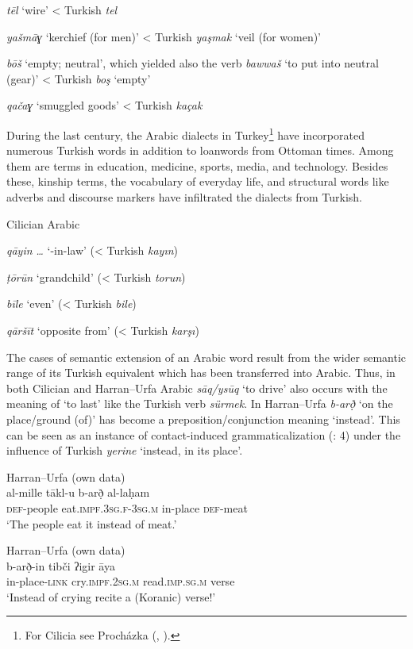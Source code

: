 \documentclass[output=paper]{langsci/langscibook}
\begin{document}
\textit{tēl} ‘wire’ < Turkish \textit{tel}

\textit{yašmāɣ} ‘kerchief (for men)’ < Turkish \textit{yaşmak} ‘veil (for women)’

\textit{bōš} ‘empty; neutral’, which yielded also the verb \textit{bawwaš} ‘to put into neutral (gear)’ < Turkish \textit{boş} ‘empty’

\textit{qačaɣ} ‘smuggled goods’ < Turkish \textit{kaçak}
\z

During the last century, the Arabic dialects in Turkey\footnote{For Cilicia see Procházka (\citeyear{Procházka2002Cukurova}, \citeyear[187--199]{Procházka2002Adana}).} have incorporated numerous Turkish words in addition to loanwords from Ottoman times. Among them are terms in education, medicine, sports, media, and technology. Besides these, kinship terms, the vocabulary of everyday life, and structural words like adverbs and discourse markers have infiltrated the dialects from Turkish. 

\ea
Cilician Arabic

\textit{qāyin} \textit{…} ‘-in-law’ (< Turkish \textit{kayın})

\textit{ṭōrūn} ‘grandchild’ (< Turkish \textit{torun})

\textit{bīle} ‘even’ (< Turkish \textit{bile})

\textit{qāršīt} ‘opposite from’ (< Turkish \textit{karşı})
\z

The cases of semantic extension of an Arabic word result from the wider semantic range of its Turkish equivalent which has been transferred into Arabic. Thus, in both Cilician and Harran--Urfa Arabic \textit{sāq/ysūq} ‘to drive’ also occurs with the meaning of ‘to last’ like the Turkish verb \textit{sürmek}. In Harran--Urfa \textit{b-arð̣} ‘on the place/ground (of)’ has become a preposition/conjunction meaning ‘instead’. This can be seen as an instance of contact-induced grammaticalization (\citealt{GardaniArkadievAmiridze2015}: 4) under the influence of Turkish \textit{yerine} ‘instead, in its place’.

\ea
{Harran--Urfa (own data)}\\
 \gll   al-mille tākl-u b-arð̣ al-laḥam\\
     \textsc{def}{}-people eat.\textsc{impf.3sg.f-3sg.m}  in-place \textsc{def}{}-meat\\
\glt  ‘The people eat it instead of meat.’
\z

\ea\label{ex:prochazka:} 
{Harran--Urfa (own data)}\\
\gll    b-arð̣-in tibči ʔigir āya\\
     in-place-\textsc{link} cry.\textsc{impf.2sg.m} read.\textsc{imp.sg.m} verse\\
\glt ‘Instead of crying recite a (Koranic) verse!’
\z
\end{document}
